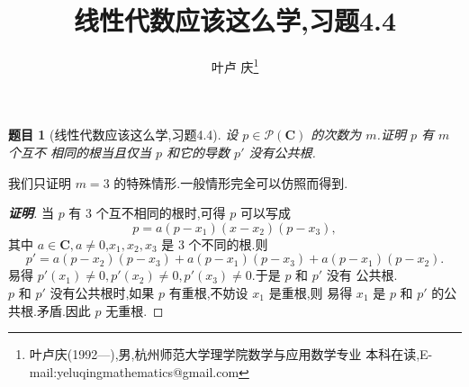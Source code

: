 \documentclass[a4paper]{article}
\newtheorem*{exe}{题目}
\newenvironment{exercise}
{\bigskip\begin{mdframed}\begin{exe}}
    {\end{exe}\end{mdframed}\bigskip}
\begin{document}
\title{\huge{\bf{线性代数应该这么学,习题4.4}}} \author{\small{叶卢
    庆\footnote{叶卢庆(1992---),男,杭州师范大学理学院数学与应用数学专业
      本科在读,E-mail:yeluqingmathematics@gmail.com}}}
\maketitle
\begin{exercise}[线性代数应该这么学,习题4.4]
设 $p\in \mathcal{P}(\mathbf{C})$ 的次数为 $m$.证明 $p$ 有 $m$ 个互不
相同的根当且仅当 $p$ 和它的导数 $p'$ 没有公共根.  
\end{exercise}
我们只证明 $m=3$ 的特殊情形.一般情形完全可以仿照而得到.
\begin{proof}[\textbf{证明}]
当 $p$ 有 $3$ 个互不相同的根时,可得 $p$ 可以写成
$$
p=a(p-x_1)(x-x_{2})(p-x_3),
$$
其中 $a\in \mathbf{C},a\neq 0$,$x_1,x_{2},x_3$ 是 $3$ 个不同的根.则
$$
p'=a(p-x_2)(p-x_3)+a(p-x_1)(p-x_3)+a(p-x_1)(p-x_2).
$$
易得 $p'(x_1)\neq 0,p'(x_2)\neq 0,p'(x_3)\neq 0$.于是 $p$ 和 $p'$ 没有
公共根.\\

 $p$ 和 $p'$ 没有公共根时,如果 $p$ 有重根,不妨设 $x_1$ 是重根,则
易得 $x_1$ 是 $p$ 和 $p'$ 的公共根.矛盾.因此 $p$ 无重根.
\end{proof}
\end{document}
